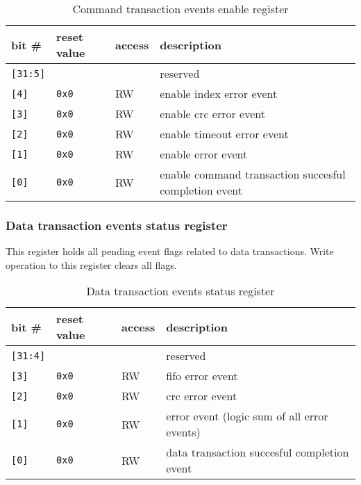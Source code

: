     \begin{table}[H]
    \caption{Command transaction events enable register}
        \begin{tabular}{m{1.3cm}|m{2cm}|m{1cm}|m{8cm}}
                \rowcolor[gray]{0.7} bit \# & reset value & access & description \\ \hline \hline
                \texttt{[31:5]} & & & reserved \\ \hline
                \texttt{[4]} & \texttt{0x0} & RW & enable index error event \\ \hline
                \texttt{[3]} & \texttt{0x0} & RW & enable crc error event \\ \hline
                \texttt{[2]} & \texttt{0x0} & RW & enable timeout error event \\ \hline
                \texttt{[1]} & \texttt{0x0} & RW & enable error event \\ \hline
                \texttt{[0]} & \texttt{0x0} & RW & enable command transaction succesful completion event \\ \hline
                \hline
        \end{tabular}
        \label{tab:cmd_ena_reg}
    \end{table}
    
    \subsubsection{Data transaction events status register}
    \label{sec:data_evt_reg}
    
    This register holds all pending event flags related to data transactions. Write operation to this register
    clears all flags.
    
    \begin{table}[H]
    \caption{Data transaction events status register}
        \begin{tabular}{m{1.3cm}|m{2cm}|m{1cm}|m{8cm}}
                \rowcolor[gray]{0.7} bit \# & reset value & access & description \\ \hline \hline
                \texttt{[31:4]} & & & reserved \\ \hline
                \texttt{[3]} & \texttt{0x0} & RW & fifo error event \\ \hline
                \texttt{[2]} & \texttt{0x0} & RW & crc error event \\ \hline
                \texttt{[1]} & \texttt{0x0} & RW & error event (logic sum of all error events) \\ \hline
                \texttt{[0]} & \texttt{0x0} & RW & data transaction succesful completion event \\ \hline
                \hline
        \end{tabular}
        \label{tab:data_evt_reg}
    \end{table}
    
